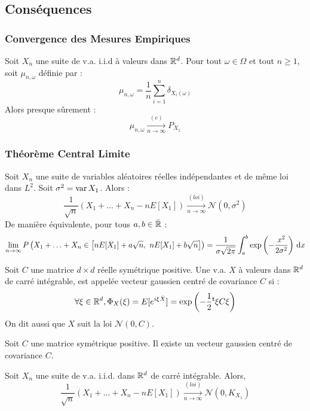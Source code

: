 \documentclass{cours}
\begin{document}
\subsection{Conséquences}
\subsubsection{Convergence des Mesures Empiriques}
\begin{theorem}
    Soit $X_{n}$ une suite de v.a. i.i.d à valeurs dans $\mathbb{R}^{d}$. Pour tout $\omega \in \Omega$ et tout $n \geq 1$, soit $\mu_{n, \omega}$ définie par : 
    \[
        \mu_{n, \omega} = \frac{1}{n}\sum_{i = 1}^{n}\delta_{X_{i}(\omega)}
    \]
    Alors presque sûrement : 
    \[
        \mu_{n, \omega} \xrightarrow[n \to \infty]{(e)} P_{X_{1}}
    \]
\end{theorem}

\subsubsection{Théorème Central Limite}
\begin{theorem}
    Soit $X_{n}$ une suite de variables aléatoires réelles indépendantes et de même loi dans $L^{2}$. Soit $\sigma^{2} =\operatorname{var} X_{1}$. Alors : 
    \[
        \frac{1}{\sqrt{n}}\left(X_{1} + \ldots + X_{n} - n E[X_{1}]\right) \xrightarrow[n \to \infty]{(loi)} \mathcal{N}(0, \sigma^{2})
    \]
    De manière équivalente, pour tous $a, b \in \bar{\mathbb{R}}$ :
    \[
        \lim_{n \to \infty} P\left(X_{1} + \ldots + X_{n} \in \left[n E[X_{1}] + a\sqrt{n}, \ nE[X_{1}] + b\sqrt{n}\right]\right) = \frac{1}{\sigma\sqrt{2\pi}}\int_{a}^{b}\exp\left(-\frac{x^{2}}{2\sigma^{2}}\right)\d x
    \] 
\end{theorem}

\begin{definition}
    Soit $C$ une matrice $d \times d$ réelle symétrique positive. Une v.a. $X$ à valeurs dans $\mathbb{R}^{d}$ de carré intégrable, est appelée vecteur gaussien centré de covariance $C$ si : 
    \[
        \forall \xi \in \mathbb{R}^{d}, \Phi_{X}(\xi) = E[e^{i\xi\dot X}] = \exp\left(-\frac{1}{2}{^{\mathsf{t}}}\xi C\xi\right)
    \]
    On dit aussi que $X$ suit la loi $\mathcal{N}(0, C)$.
\end{definition}

\begin{proposition}
    Soit $C$ une matrice symétrique positive. Il existe un vecteur gaussien centré de covariance $C$. 
\end{proposition}

\begin{theorem}
    Soit $X_{n}$ une suite de v.a. i.i.d. dans $\mathbb{R}^{d}$ de carré intégrable. Alors, 
    \[
        \frac{1}{\sqrt{n}}\left(X_{1} + \ldots + X_{n} - nE[X_{1}]\right)\xrightarrow[n \to \infty]{(loi)}\mathcal{N}(0, K_{X_{1}})
    \]
\end{theorem}
\end{document}
